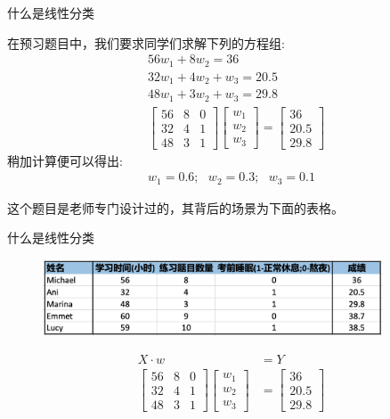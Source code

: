 \documentclass[handout]{beamer}
\begin{document}
\begin{frame}{什么是线性分类}
	\begin{example}
		在预习题目中，我们要求同学们求解下列的方程组:
	\begin{align*}
	& 56w_1 + 8 w_2 = 36 \\
	& 32 w_1+ 4 w_2 + w_3 = 20.5 \\
	& 48 w_1 + 3w_2 + w_3 = 29.8 \\
	& \begin{bmatrix}
		56 & 8 & 0 \\
		32 & 4 & 1 \\
		48 & 3 & 1 
	\end{bmatrix} \begin{bmatrix}
		w_1 \\
		w_2 \\
		w_3
	\end{bmatrix} = \begin{bmatrix}
		36 \\
		20.5 \\
		29.8 
	\end{bmatrix} 
\end{align*}
稍加计算便可以得出:
\begin{align*}
	w_1= 0.6; \ \ \ w_2 = 0.3; \ \ \ w_3 = 0.1 
\end{align*}
	\end{example}
	这个题目是老师专门设计过的，其背后的场景为下面的表格。
\end{frame}

\begin{frame}{什么是线性分类}
	\begin{figure}[H]
		\centering
		\includegraphics[width=0.9\textwidth]{fig/C1C2grade}
	\end{figure}
	\begin{example}
	\begin{align*}
		X \cdot w & = Y \\
		\begin{bmatrix}
		56 & 8 & 0 \\
		32 & 4 & 1 \\
		48 & 3 & 1 
	\end{bmatrix} \begin{bmatrix}
		w_1 \\
		w_2 \\
		w_3
	\end{bmatrix} & = \begin{bmatrix}
		36 \\
		20.5 \\
		29.8 
	\end{bmatrix}
	\end{align*}	
	\end{example}
\end{frame}
\end{document}
